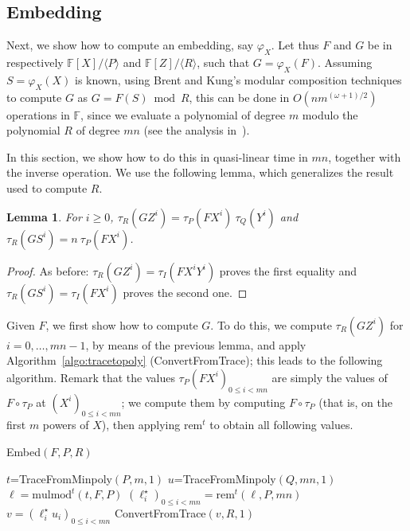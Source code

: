 \documentclass[12pt]{article}
\def\F {\ensuremath{\mathbb{F}}}
\def\rem {\ensuremath{\mathrm{rem}}}
\def\mulmod {\ensuremath{\mathrm{mulmod}}}
\newtheorem{Lemma}{Lemma}
\begin{document}
\subsection{Embedding} 

Next, we show how to compute an embedding, say $\varphi_X$. Let thus
$F$ and $G$ be in respectively $\F[X]/\langle P \rangle$ and
$\F[Z]/\langle R \rangle$, such that $G=\varphi_X(F)$. Assuming
$S=\varphi_X(X)$ is known, using Brent and Kung's modular composition
techniques~\cite{brent+kung} to compute $G$ as $G=F(S) \bmod R$, this
can be done in $O(n m^{(\omega+1)/2})$ operations in $\F$, since we
evaluate a polynomial of degree $m$ modulo the polynomial $R$ of
degree $mn$ (see the analysis in~\cite{shoup94}).

In this section, we show how to do this in quasi-linear time in $mn$,
together with the inverse operation. We use the following lemma, which
generalizes the result used to compute $R$.

\begin{Lemma}\label{lemma:traces:PQR}
  For $i \ge 0$, $\tau_R(G Z^i) = \tau_P(F X^i) \ \tau_Q(Y^i)$ and
  $\tau_R(G S^i) = n\ \tau_P(F X^i)$.
\end{Lemma}
\begin{proof}
As before: $\tau_R(G Z^i) = \tau_I(F X^i Y^i)$ proves the first
equality and $\tau_R(G S^i) = \tau_I(F X^i)$ proves the second one.
\end{proof}

Given $F$, we first show how to compute $G$. To do this, we compute
$\tau_R(G Z^i)$ for $i=0,\dots,mn-1$, by means of the previous lemma,
and apply Algorithm~\ref{algo:tracetopoly} (ConvertFromTrace); this
leads to the following algorithm. Remark that the values $\tau_P(F
X^i)_{0 \le i < mn}$ are simply the values of $F \circ \tau_P$ at
$(X^i)_{0 \le i < mn}$; we compute them by computing $F \circ \tau_P$
(that is, on the first $m$ powers of $X$), then applying $\rem^t$ to
obtain all following values.

\begin{algorithm}[H]
  \caption{Embed$(F,P,R)$}
  \begin{algorithmic}[1]
    \STATE $t$=TraceFromMinpoly$(P,m,1)$
    \STATE $u$=TraceFromMinpoly$(Q,mn,1)$
    \STATE\label{algo:embed:2} $\ell = \mulmod^t(t,F,P)$
    \STATE $(\ell^\star_i)_{0 \le i < mn} = \rem^t(\ell, P, mn)$
    \STATE $v=(\ell^\star_i u_i)_{0 \le i < mn}$
    \RETURN ConvertFromTrace$(v, R, 1)$
  \end{algorithmic}
  \label{algo:embed}
\end{algorithm}
\end{document}

